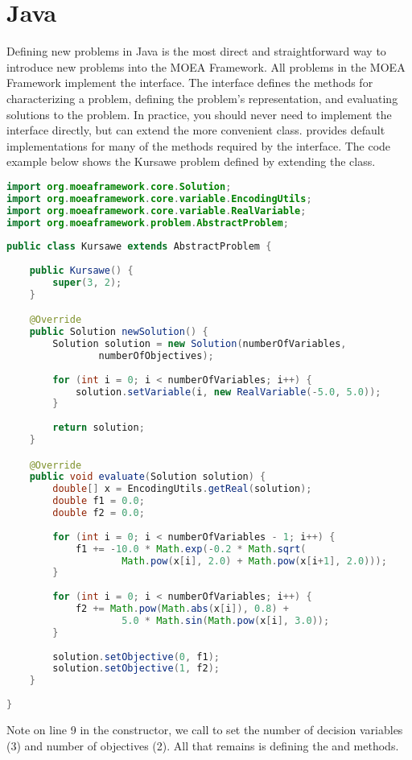 \section{Java}
Defining new problems in Java is the most direct and straightforward way to introduce new problems into the MOEA Framework.  All problems in the MOEA Framework implement the  interface.  The  interface defines the methods for characterizing a problem, defining the problem's representation, and evaluating solutions to the problem.  In practice, you should never need to implement the  interface directly, but can extend the more convenient  class.   provides default implementations for many of the methods required by the  interface.  The code example below shows the Kursawe problem defined by extending the  class.

\begin{lstlisting}[language=Java]
import org.moeaframework.core.Solution;
import org.moeaframework.core.variable.EncodingUtils;
import org.moeaframework.core.variable.RealVariable;
import org.moeaframework.problem.AbstractProblem;
 
public class Kursawe extends AbstractProblem {
 
	public Kursawe() {
		super(3, 2);
	}

	@Override
	public Solution newSolution() {
		Solution solution = new Solution(numberOfVariables, 
				numberOfObjectives);
 
		for (int i = 0; i < numberOfVariables; i++) {
			solution.setVariable(i, new RealVariable(-5.0, 5.0));
		}
 
		return solution;
	}

	@Override
	public void evaluate(Solution solution) {
		double[] x = EncodingUtils.getReal(solution);
		double f1 = 0.0;
		double f2 = 0.0;
   	 
		for (int i = 0; i < numberOfVariables - 1; i++) {
			f1 += -10.0 * Math.exp(-0.2 * Math.sqrt(
					Math.pow(x[i], 2.0) + Math.pow(x[i+1], 2.0)));
		}
 
		for (int i = 0; i < numberOfVariables; i++) {
			f2 += Math.pow(Math.abs(x[i]), 0.8) +  
					5.0 * Math.sin(Math.pow(x[i], 3.0));
		}
 
		solution.setObjective(0, f1);
		solution.setObjective(1, f2);
	}
 
}
\end{lstlisting}

Note on line 9 in the constructor, we call  to set the number of decision variables (3) and number of objectives (2).  All that remains is defining the  and  methods.

